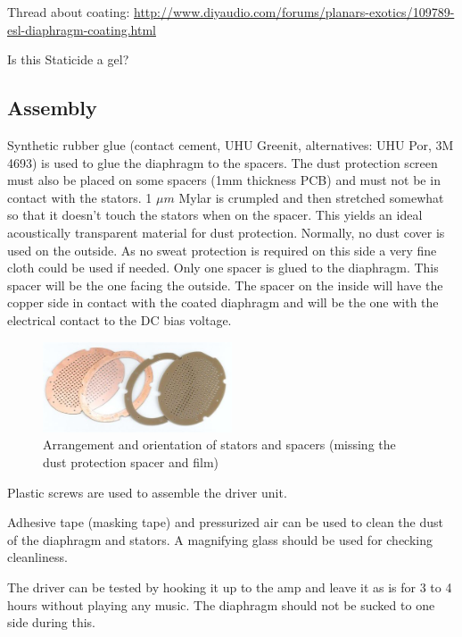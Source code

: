 \documentclass{article}
\begin{document}
Thread about coating: \url{http://www.diyaudio.com/forums/planars-exotics/109789-esl-diaphragm-coating.html}

Is this Staticide a gel?

\subsection{Assembly}
\label{s:driver:assembly}
Synthetic rubber glue (contact cement, UHU Greenit, alternatives: UHU Por, 3M 4693) is used to glue the diaphragm to the spacers. The dust protection screen must also be placed on some spacers (1mm thickness PCB) and must not be in contact with the stators. 1 $\mu m$ Mylar is crumpled and then stretched somewhat so that it doesn't touch the stators when on the spacer. This yields an ideal acoustically transparent material for dust protection. Normally, no dust cover is used on the outside. As no sweat protection is required on this side a very fine cloth could be used if needed. Only one spacer is glued to the diaphragm. This spacer will be the one facing the outside. The spacer on the inside will have the copper side in contact with the coated diaphragm and will be the one with the electrical contact to the DC bias voltage.
\begin{figure}[htb]
    \centering
    \includegraphics[width=0.5\textwidth]{images/arrangement.png}
    \caption{Arrangement and orientation of stators and spacers (missing the dust protection spacer and film)}
    \label{f:driver:assembly:arrangement}
\end{figure}

Plastic screws are used to assemble the driver unit.

Adhesive tape (masking tape) and pressurized air can be used to clean the dust of the diaphragm and stators. A magnifying glass should be used for checking cleanliness.

The driver can be tested by hooking it up to the amp and leave it as is for 3 to 4 hours without playing any music. The diaphragm should not be sucked to one side during this.
\end{document}

